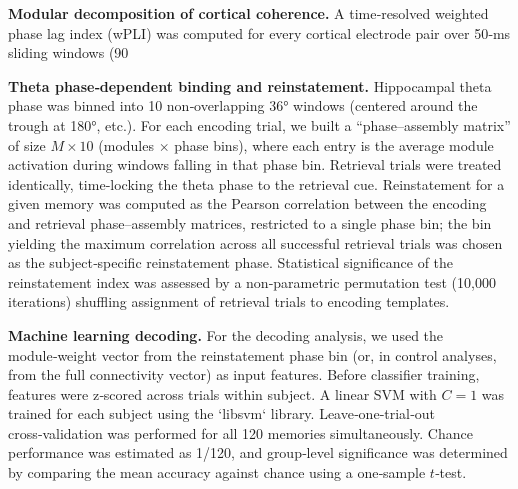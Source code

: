 \documentclass{article}
\begin{document}
\textbf{Modular decomposition of cortical coherence.} A time‑resolved weighted phase lag index (wPLI) was computed for every cortical electrode pair over 50‑ms sliding windows (90%

\textbf{Theta phase‑dependent binding and reinstatement.} Hippocampal theta phase was binned into 10 non‑overlapping 36° windows (centered around the trough at 180°, etc.). For each encoding trial, we built a “phase–assembly matrix” of size $M \times 10$ (modules $\times$ phase bins), where each entry is the average module activation during windows falling in that phase bin. Retrieval trials were treated identically, time‑locking the theta phase to the retrieval cue. Reinstatement for a given memory was computed as the Pearson correlation between the encoding and retrieval phase–assembly matrices, restricted to a single phase bin; the bin yielding the maximum correlation across all successful retrieval trials was chosen as the subject‑specific reinstatement phase. Statistical significance of the reinstatement index was assessed by a non‑parametric permutation test (10,000 iterations) shuffling assignment of retrieval trials to encoding templates.

\textbf{Machine learning decoding.} For the decoding analysis, we used the module‑weight vector from the reinstatement phase bin (or, in control analyses, from the full connectivity vector) as input features. Before classifier training, features were z‑scored across trials within subject. A linear SVM with $C=1$ was trained for each subject using the `libsvm` library. Leave‑one‑trial‑out cross‑validation was performed for all 120 memories simultaneously. Chance performance was estimated as 1/120, and group‑level significance was determined by comparing the mean accuracy against chance using a one‑sample $t$‑test.
\end{document}
